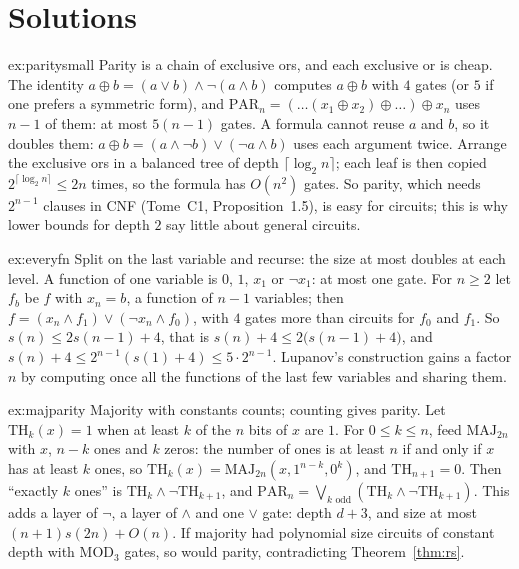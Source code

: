 \section{Solutions}

\begin{solution}{ex:paritysmall}
\idea Parity is a chain of exclusive ors, and each exclusive or is cheap.
\writeup The identity $a\oplus b=(a\lor b)\land\lnot(a\land b)$ computes $a\oplus b$ with $4$ gates (or $5$ if one prefers a symmetric form), and $\mathrm{PAR}_n=(\dots(x_1\oplus x_2)\oplus\dots)\oplus x_n$ uses $n-1$ of them: at most $5(n-1)$ gates. A formula cannot reuse $a$ and $b$, so it doubles them: $a\oplus b=(a\land\lnot b)\lor(\lnot a\land b)$ uses each argument twice. Arrange the exclusive ors in a balanced tree of depth $\lceil\log_2n\rceil$; each leaf is then copied $2^{\lceil\log_2n\rceil}\le2n$ times, so the formula has $O(n^2)$ gates. So parity, which needs $2^{n-1}$ clauses in CNF (Tome~C1, Proposition~1.5), is easy for circuits; this is why lower bounds for depth $2$ say little about general circuits.
\end{solution}

\begin{solution}{ex:everyfn}
\idea Split on the last variable and recurse: the size at most doubles at each level.
\writeup A function of one variable is $0$, $1$, $x_1$ or $\lnot x_1$: at most one gate. For $n\ge2$ let $f_b$ be $f$ with $x_n=b$, a function of $n-1$ variables; then $f=(x_n\land f_1)\lor(\lnot x_n\land f_0)$, with $4$ gates more than circuits for $f_0$ and $f_1$. So $s(n)\le2s(n-1)+4$, that is $s(n)+4\le2\bigl(s(n-1)+4\bigr)$, and $s(n)+4\le2^{n-1}(s(1)+4)\le5\cdot2^{n-1}$. Lupanov's construction gains a factor $n$ by computing once all the functions of the last few variables and sharing them.
\end{solution}

\begin{solution}{ex:majparity}
\idea Majority with constants counts; counting gives parity.
\writeup Let $\mathrm{TH}_k(x)=1$ when at least $k$ of the $n$ bits of $x$ are $1$. For $0\le k\le n$, feed $\mathrm{MAJ}_{2n}$ with $x$, $n-k$ ones and $k$ zeros: the number of ones is at least $n$ if and only if $x$ has at least $k$ ones, so $\mathrm{TH}_k(x)=\mathrm{MAJ}_{2n}(x,1^{n-k},0^k)$, and $\mathrm{TH}_{n+1}=0$. Then ``exactly $k$ ones'' is $\mathrm{TH}_k\land\lnot\mathrm{TH}_{k+1}$, and $\mathrm{PAR}_n=\bigvee_{k\text{ odd}}(\mathrm{TH}_k\land\lnot\mathrm{TH}_{k+1})$. This adds a layer of $\lnot$, a layer of $\land$ and one $\lor$ gate: depth $d+3$, and size at most $(n+1)s(2n)+O(n)$. If majority had polynomial size circuits of constant depth with $\mathrm{MOD}_3$ gates, so would parity, contradicting Theorem~\ref{thm:rs}.
\end{solution}

